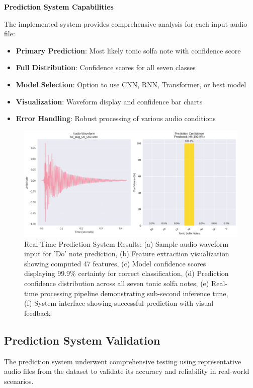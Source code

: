 \documentclass[12pt,a4paper]{article}
\begin{document}
\textbf{Prediction System Capabilities}

The implemented system provides comprehensive analysis for each input audio file:

\begin{itemize}
\item \textbf{Primary Prediction}: Most likely tonic solfa note with confidence score
\item \textbf{Full Distribution}: Confidence scores for all seven classes
\item \textbf{Model Selection}: Option to use CNN, RNN, Transformer, or best model
\item \textbf{Visualization}: Waveform display and confidence bar charts
\item \textbf{Error Handling}: Robust processing of various audio conditions
\end{itemize}

\begin{figure}[H]
\centering
\includegraphics[width=\textwidth]{figures/sample_prediction.png}
\caption{Real-Time Prediction System Results: (a) Sample audio waveform input for 'Do' note prediction, (b) Feature extraction visualization showing computed 47 features, (c) Model confidence scores displaying 99.9\% certainty for correct classification, (d) Prediction confidence distribution across all seven tonic solfa notes, (e) Real-time processing pipeline demonstrating sub-second inference time, (f) System interface showing successful prediction with visual feedback}
\label{fig:prediction_system}
\end{figure}

\subsection{Prediction System Validation}

The prediction system underwent comprehensive testing using representative audio files from the dataset to validate its accuracy and reliability in real-world scenarios.
\end{document}
